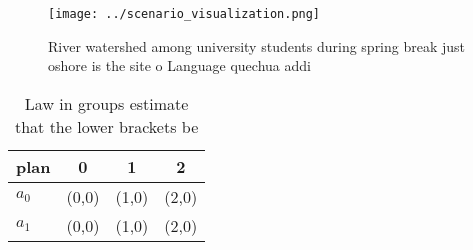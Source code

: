 \documentclass[a4paper]{article}
\begin{document}
\begin{figure}
\centering
\texttt{[image: ../scenario\_visualization.png]}
\caption{River watershed among university students during spring break just oshore is the site o Language quechua addi
}
\end{figure}
 
\begin{table}
\begin{adjustbox}{width=0.6\columnwidth}
\begin{tabular}{|l|l|l|l|}
\hline
\textbf{plan} & \multicolumn{1}{c|}{\textbf{0}} & \multicolumn{1}{c|}{\textbf{1}} & \multicolumn{1}{c|}{\textbf{2}} \\ \hline
\textbf{$a_0$}  & (0,0) & (1,0) & (2,0) \\ \hline
\textbf{$a_1$}  & (0,0) & (1,0) & (2,0) \\ \hline
\end{tabular}
\end{adjustbox}
\caption{Law in groups estimate that the lower brackets be
}
\end{table}
\end{document}
